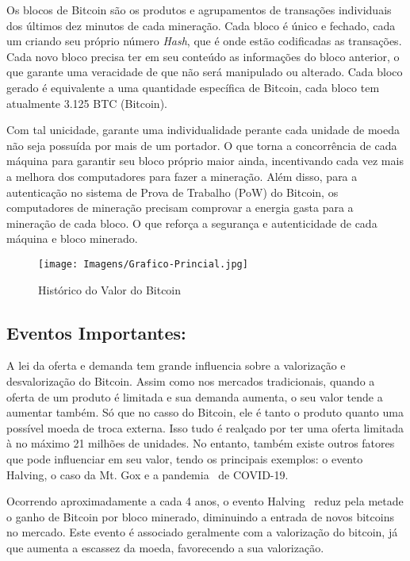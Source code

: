 Os blocos de Bitcoin são os produtos e agrupamentos de transações individuais dos últimos dez minutos de cada mineração. Cada bloco é único e fechado, cada um criando seu próprio número \textit{Hash}, que é onde estão codificadas as transações. Cada novo bloco precisa ter em seu conteúdo as informações do bloco anterior, o que garante uma veracidade de que não será manipulado ou alterado. Cada bloco gerado é equivalente a uma quantidade específica de Bitcoin, cada bloco tem atualmente 3.125 BTC (Bitcoin).

Com tal unicidade, garante uma individualidade perante cada unidade de moeda não seja possuída por mais de um portador. O que torna a concorrência de cada máquina para garantir seu bloco próprio maior ainda, incentivando cada vez mais a melhora dos computadores para fazer a mineração. Além disso, para a autenticação no sistema de Prova de Trabalho (PoW) do Bitcoin, os computadores de mineração precisam comprovar a energia gasta para a mineração de cada bloco. O que reforça a segurança e autenticidade de cada máquina e bloco minerado.

\begin{figure}
    \centering
    \texttt{[image: Imagens/Grafico-Princial.jpg]}
    \caption{Histórico do Valor do Bitcoin}
    \label{fig:Candle Graph}
\end{figure}

\subsection{\textbf{Eventos Importantes:}}

A lei da oferta e demanda tem grande influencia sobre a valorização e  desvalorização do Bitcoin.  Assim como nos mercados tradicionais, quando a oferta de um produto é limitada e sua demanda aumenta, o seu valor tende a aumentar também. Só que no casso do Bitcoin, ele é tanto o produto quanto uma possível moeda de troca externa. Isso tudo é realçado por ter uma oferta limitada à no máximo 21 milhões de unidades. No entanto, também existe outros fatores que pode influenciar  em seu valor, tendo os principais exemplos: o evento Halving, o caso da Mt. Gox e a pandemia  de COVID-19.

Ocorrendo aproximadamente a cada 4 anos, o evento Halving  reduz pela metade o ganho de Bitcoin por bloco minerado, diminuindo a entrada de novos bitcoins no mercado. Este evento é associado geralmente com a valorização do bitcoin, já que aumenta a escassez da moeda, favorecendo a sua valorização.

